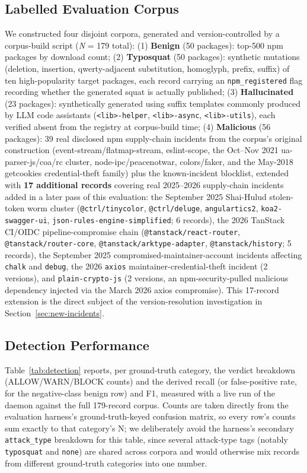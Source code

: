 \documentclass[journal]{IEEEtran}
\begin{document}
\subsection{Labelled Evaluation Corpus}
We constructed four disjoint corpora, generated and version-controlled by a corpus-build script
(\emph{N} = 179 total): (1) \textbf{Benign} (50 packages): top-500 npm packages by download count; (2)
\textbf{Typosquat} (50 packages): synthetic mutations (deletion, insertion, qwerty-adjacent substitution,
homoglyph, prefix, suffix) of ten high-popularity target packages, each record carrying an
\texttt{npm\_registered} flag recording whether the generated squat is actually published; (3)
\textbf{Hallucinated} (23 packages): synthetically generated using suffix templates commonly produced by LLM
code assistants (\texttt{<lib>-helper}, \texttt{<lib>-async}, \texttt{<lib>-utils}), each verified absent
from the registry at corpus-build time; (4) \textbf{Malicious} (56 packages): 39 real disclosed npm
supply-chain incidents from the corpus's original construction (event-stream/flatmap-stream, eslint-scope,
the Oct--Nov 2021 ua-parser-js/coa/rc cluster, node-ipc/peacenotwar, colors/faker, and the May-2018
getcookies credential-theft family) plus the known-incident blocklist, extended with \textbf{17 additional
records} covering real 2025--2026 supply-chain incidents added in a later pass of this evaluation: the
September 2025 Shai-Hulud stolen-token worm cluster (\texttt{@ctrl/tinycolor}, \texttt{@ctrl/deluge},
\texttt{angulartics2}, \texttt{koa2-swagger-ui}, \texttt{json-rules-engine-simplified}; 6 records), the
2026 TanStack CI/OIDC pipeline-compromise chain (\texttt{@tanstack/react-router},
\texttt{@tanstack/router-core}, \texttt{@tanstack/arktype-adapter}, \texttt{@tanstack/history}; 5 records),
the September 2025 compromised-maintainer-account incidents affecting \texttt{chalk} and \texttt{debug}, the
2026 \texttt{axios} maintainer-credential-theft incident (2 versions), and \texttt{plain-crypto-js} (2
versions, an npm-security-pulled malicious dependency injected via the March 2026 axios compromise). This
17-record extension is the direct subject of the version-resolution investigation in
Section~\ref{sec:new-incidents}.

\subsection{Detection Performance}
Table~\ref{tab:detection} reports, per ground-truth category, the verdict breakdown (ALLOW/WARN/BLOCK counts)
and the derived recall (or false-positive rate, for the negative-class benign row) and F1, measured with a
live run of the daemon against the full 179-record corpus. Counts are taken directly from the evaluation
harness's ground-truth-keyed confusion matrix, so every row's counts sum exactly to that category's N; we
deliberately avoid the harness's secondary \texttt{attack\_type} breakdown for this table, since several
attack-type tags (notably \texttt{typosquat} and \texttt{none}) are shared across corpora and would otherwise
mix records from different ground-truth categories into one number.
\end{document}
